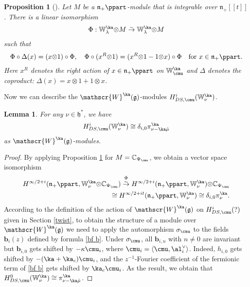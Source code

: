 \documentclass{amsart}
\newcommand{\Wak}[2]{\mathbb{W}_{#1}^{#2}}
\newcommand{\bra}{{\langle}}
\newcommand{\ket}{{\rangle}}
\newcommand{\+}{\mathop{\oplus}}
\renewcommand{\*}{{\otimes}}
\newcommand{\mf}{\mathfrak}
\newcommand{\g}{\mf{g}}
\newcommand{\h}{\mf{h}}
\newcommand{\isomap}{{\;\stackrel{_\sim}{\to}\;}}
\newcommand{\C}{\mathbb{C}}
\newcommand{\W}{\mathscr{W}}
\newcommand{\lam}{\lambda}
\theoremstyle{theorem}
\newtheorem{Pro}[Th]{Proposition}
\newtheorem{Lem}[Th]{Lemma}
\theoremstyle{remark}
\numberwithin{equation}{section}
\begin{document}
\begin{Pro}[{\cite[Proposition 2.1]{A-BGG}}]\label{Pro:key-iso}
Let $M$ be a $\mf{n}_+\ppart$-module 
that is integrable over $\mf{n}_+[[t]]$.
There is a linear isomorphism
\begin{align*}
\Phi:\Wak{\lam}{\ka}\* M\isomap \Wak{\lam}{\ka}\*  M
\end{align*}
such that
\begin{align*}
\Phi\circ \Delta(x)=(x\*1)\circ \Phi,
\quad \Phi \circ (x^R\*1)=(x^R\*1-1\* x) \circ \Phi\quad \text{for
}x\in \mf{n}_+\ppart.
\end{align*}
Here $x^R$ denotes the right action of $x\in \mf{n}_+\ppart$ on
$\Wak{\cmu}{\ka}$ and
$\Delta$ denotes the coproduct:
$\Delta(x)=x\*1 +1\*x$.\end{Pro}

Now we can describe the $\W^\ka(\g)$-modules
$H^i_{DS,\cmu}(\Wak{\nu}{\ka})$.

\begin{Lem}\label{pi shift}
For any $\nu \in \h^*$, we have
\begin{equation}    \label{HW}
H^i_{DS,\cmu}(\Wak{\nu}{\ka})\cong
  \delta_{i,0}\pi^\ka_{\nu-\ka\check{\mu}}
\end{equation}
as $\W^\ka(\g)$-modules.
\end{Lem}
\begin{proof}
By applying Proposition \ref{Pro:key-iso}
for $M=\C_{\Psi_{\cmu}}$,
we obtain a vector space isomorphism
\begin{align*}
H^{\infty/2+i}(\mf{n}_+\ppart,\Wak{\nu}{\ka}\*
\C_{\Psi_{\cmu}})\overset{\Phi}{\isomap}
H^{\infty/2+i}(\mf{n}_+\ppart, \Wak{\nu}{\ka})\*\C_{ \Psi_{\cmu}}\\
\cong H^{\infty/2+it}(\mf{n}_+\ppart, \Wak{\nu}{\ka})
\cong \delta_{i,0}\pi^\ka_{\nu}.
\end{align*}
According to the definition of the action of $\W^\ka(\g)$ on
$H^i_{DS,\cmu}(?)$ given in Section \ref{twist}, to obtain the
structure of a module over $\W^\ka(\g)$ we need to apply the
automorphism $\sigma_{\cmu}$ to the fields ${\mathbf b}_i(z)$ defined
by formula \eqref{bf b}. Under $\sigma_{\cmu}$, all ${\mathbf
  b}_{i,n}$ with $n \neq 0$ are invariant but ${\mathbf b}_{i,0}$ gets
shifted by $-\kappa \cmu_i$, where $\cmu_i = \bra
\cmu,\al_i^\vee\ket$. Indeed, $h_{i,0}$ gets shifted by
$-(\ka+\ka_c)\cmu_i$, and the $z^{-1}$-Fourier coefficient of the
fermionic term of \eqref{bf b} gets shifted by $\ka_c \cmu_i$. As the
result, we obtain that $H^0_{DS,\cmu}(\Wak{\nu}{\ka}) \cong
\pi^\ka_{\nu-\ka\check{\mu}}$.
\end{proof}
\end{document}
